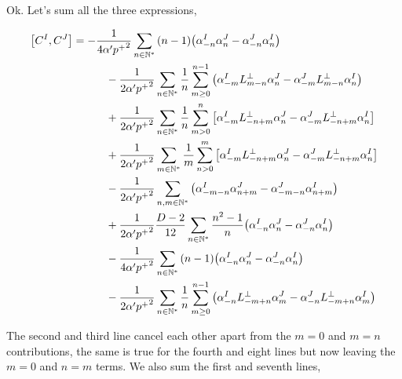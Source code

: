 Ok. Let's sum all the three expressions,

\begin{align*}
    \comm{C^{I}}{C^{J}}&=-\frac{1}{4\alpha'{p^+}^2}\sum\limits_{n\in\mathbb N^\ast}\qty(n-1)\qty(\alpha^I_{-n}\alpha^J_n-\alpha^J_{-n}\alpha^I_n)\\
    &\quad\quad\quad-\frac{1}{2\alpha'{p^+}^2}\sum\limits_{n\in\mathbb N^\ast}\frac{1}{n}\sum\limits_{m\geq0}^{n-1}\qty(\alpha_{-m}^IL^\perp_{m-n}\alpha^J_n-\alpha^J_{-m}L^\perp_{m-n}\alpha^I_n)\\
    &\quad\quad\quad+\frac{1}{2\alpha'{p^+}^2}\sum\limits_{n\in\mathbb N^\ast}\frac1n\sum\limits_{m>0}^n\qty[\alpha^I_{-m}L^\perp_{-n+m}\alpha_n^J-\alpha^J_{-m}L^\perp_{-n+m}\alpha_n^I]\\
    &\quad\quad\quad+\frac{1}{2\alpha'{p^+}^2}\sum\limits_{m\in\mathbb N^\ast}\frac1m\sum\limits_{n>0}^m\qty[\alpha^I_{-m}L^\perp_{-n+m}\alpha_n^J-\alpha^J_{-m}L^\perp_{-n+m}\alpha_n^I]\\
    &\quad\quad\quad-\frac{1}{2\alpha'{p^+}^2}\sum\limits_{n,m\in\mathbb N^\ast}\left(\alpha^I_{-m-n}\alpha^J_{n+m}-\alpha^J_{-m-n}\alpha^I_{n+m}\right)\\
    &\quad\quad\quad+\frac{1}{2\alpha'{p^+}^2}\frac{D-2}{12}\sum\limits_{n\in\mathbb N^\ast}\frac{n^2-1}{n}\qty(\alpha^I_{-n}\alpha_n^J-\alpha^J_{-n}\alpha_n^I)\\
    &\quad\quad\quad-\frac{1}{4\alpha'{p^+}^2}\sum\limits_{n\in\mathbb N^\ast}\qty(n-1)\qty(\alpha_{-n}^I\alpha^J_{n}-\alpha_{-n}^J\alpha^I_n)\\
    &\quad\quad\quad-\frac{1}{2\alpha'{p^+}^2}\sum\limits_{n\in\mathbb N^\ast}\frac{1}{n}\sum\limits_{m\geq0}^{n-1}\qty(\alpha_{-n}^IL^\perp_{-m+n}\alpha^J_{m}-\alpha_{-n}^JL^\perp_{-m+n}\alpha^I_{m})
\end{align*}

The second and third line cancel each other apart from the $m=0$ and $m=n$ contributions, the same is true for the fourth and eight lines but now leaving the $m=0$ and $n=m$ terms. We also sum the 
first and seventh lines,

